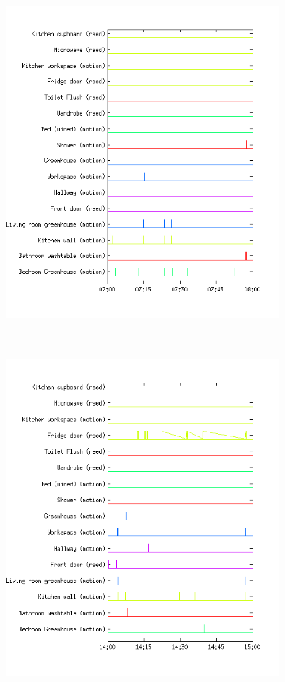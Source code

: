 \documentclass[11pt,a4paper]{article}
\begin{document}
\begin{figure}[h!]
  \centering
  \begin{subfigure}[b]{0.45\textwidth}
    \centering
    \includegraphics[width=\textwidth]{Pictures/SensorsMorning.png}
  \end{subfigure}
  ~
  \begin{subfigure}[b]{0.45\textwidth}
    \centering
    \includegraphics[width=\textwidth]{Pictures/SensorsNoon.png}

\end{subfigure}
\end{figure}
\end{document}
